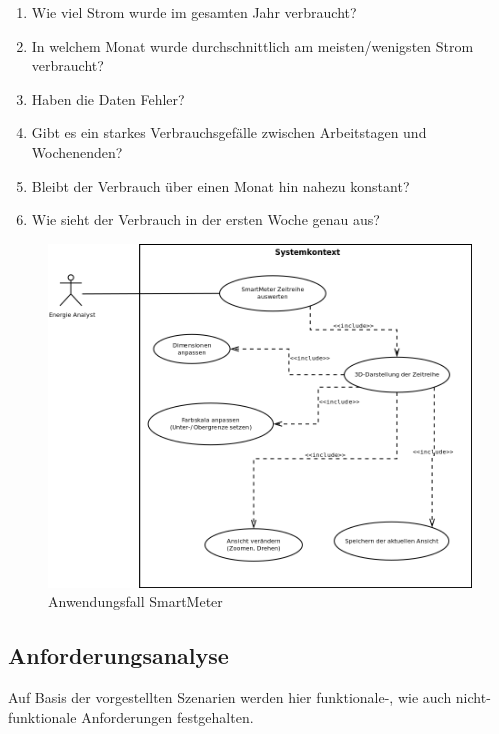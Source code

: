 \documentclass[12pt]{article}
\begin{document}
			\begin{enumerate}
			  \item Wie viel Strom wurde im gesamten Jahr verbraucht?
			  \item In welchem Monat wurde durchschnittlich am meisten/wenigsten Strom
			  verbraucht?
			  \item Haben die Daten Fehler?
			  \item Gibt es ein starkes Verbrauchsgefälle zwischen Arbeitstagen und
			  Wochenenden?
			  \item Bleibt der Verbrauch über einen Monat hin nahezu konstant?
			  \item Wie sieht der Verbrauch in der ersten Woche genau aus?
			\end{enumerate}
			
			
			\begin{figure}[hb]
					\includegraphics[width=1.0\textwidth]{dia/usecase-smartmeter.png}
					\caption[smartmeter]{Anwendungsfall SmartMeter}
			\end{figure}
		
	\subsection{Anforderungsanalyse}
		Auf Basis der vorgestellten Szenarien werden hier funktionale-, wie auch
		nicht-funktionale Anforderungen festgehalten.
\end{document}
